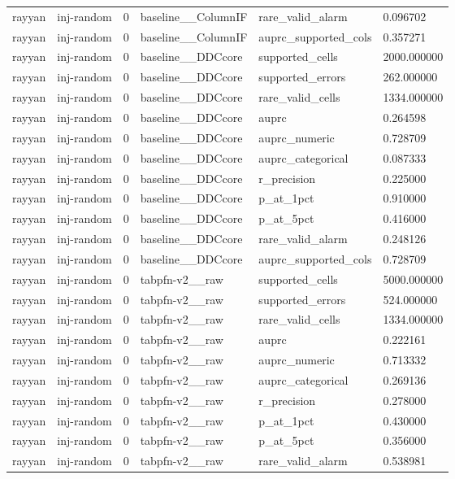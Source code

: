 \begin{tabular}{llllll}
rayyan & inj-random & 0 & baseline\_\_ColumnIF & rare\_valid\_alarm & 0.096702 \\
rayyan & inj-random & 0 & baseline\_\_ColumnIF & auprc\_supported\_cols & 0.357271 \\
rayyan & inj-random & 0 & baseline\_\_DDCcore & supported\_cells & 2000.000000 \\
rayyan & inj-random & 0 & baseline\_\_DDCcore & supported\_errors & 262.000000 \\
rayyan & inj-random & 0 & baseline\_\_DDCcore & rare\_valid\_cells & 1334.000000 \\
rayyan & inj-random & 0 & baseline\_\_DDCcore & auprc & 0.264598 \\
rayyan & inj-random & 0 & baseline\_\_DDCcore & auprc\_numeric & 0.728709 \\
rayyan & inj-random & 0 & baseline\_\_DDCcore & auprc\_categorical & 0.087333 \\
rayyan & inj-random & 0 & baseline\_\_DDCcore & r\_precision & 0.225000 \\
rayyan & inj-random & 0 & baseline\_\_DDCcore & p\_at\_1pct & 0.910000 \\
rayyan & inj-random & 0 & baseline\_\_DDCcore & p\_at\_5pct & 0.416000 \\
rayyan & inj-random & 0 & baseline\_\_DDCcore & rare\_valid\_alarm & 0.248126 \\
rayyan & inj-random & 0 & baseline\_\_DDCcore & auprc\_supported\_cols & 0.728709 \\
rayyan & inj-random & 0 & tabpfn-v2\_\_raw & supported\_cells & 5000.000000 \\
rayyan & inj-random & 0 & tabpfn-v2\_\_raw & supported\_errors & 524.000000 \\
rayyan & inj-random & 0 & tabpfn-v2\_\_raw & rare\_valid\_cells & 1334.000000 \\
rayyan & inj-random & 0 & tabpfn-v2\_\_raw & auprc & 0.222161 \\
rayyan & inj-random & 0 & tabpfn-v2\_\_raw & auprc\_numeric & 0.713332 \\
rayyan & inj-random & 0 & tabpfn-v2\_\_raw & auprc\_categorical & 0.269136 \\
rayyan & inj-random & 0 & tabpfn-v2\_\_raw & r\_precision & 0.278000 \\
rayyan & inj-random & 0 & tabpfn-v2\_\_raw & p\_at\_1pct & 0.430000 \\
rayyan & inj-random & 0 & tabpfn-v2\_\_raw & p\_at\_5pct & 0.356000 \\
rayyan & inj-random & 0 & tabpfn-v2\_\_raw & rare\_valid\_alarm & 0.538981 \\

\end{tabular}
